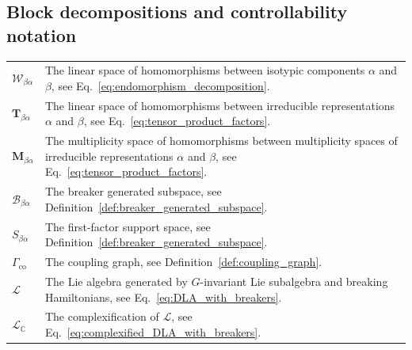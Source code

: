 \documentclass[10pt,twocolumn,superscriptaddress,aps,amsmath,amssymb,citeautoscript,floatfix,prx]{revtex4-2}
\newcounter{alg}
\theoremstyle{plain}
\theoremstyle{plain}
\theoremstyle{plain}
\theoremstyle{plain}
\theoremstyle{plain}
\theoremstyle{plain}
\newcommand{\C}{\mathbb{C}}
\theoremstyle{plain}
\theoremstyle{definition}
\theoremstyle{plain}
\begin{document}
\begin{appendix}
\begin{tabular}{@{}ll@{}}
\end{tabular}


\subsection*{Block decompositions and controllability notation}

\begin{tabular}{@{}ll@{}}

\parbox[t]{0.22\textwidth}{$\mathcal{W}_{\beta \alpha}$} & \parbox[t]{0.72\textwidth}{The linear space of homomorphisms between isotypic components $\alpha$ and $\beta$, see Eq.~\eqref{eq:endomorphism_decomposition}.} \\[0.6em]

\parbox[t]{0.22\textwidth}{$\mathbf{T}_{\beta \alpha}$} & \parbox[t]{0.72\textwidth}{The linear space of homomorphisms between irreducible representations $\alpha$ and $\beta$, see Eq.~\eqref{eq:tensor_product_factors}.} \\[0.6em]

\parbox[t]{0.22\textwidth}{$\mathbf{M}_{\beta \alpha}$} & \parbox[t]{0.72\textwidth}{The multiplicity space of homomorphisms between multiplicity spaces of irreducible representations $\alpha$ and $\beta$, see Eq.~\eqref{eq:tensor_product_factors}.} \\[0.6em]

\parbox[t]{0.22\textwidth}{$\mathcal{B}_{\beta \alpha}$} & \parbox[t]{0.72\textwidth}{The breaker generated subspace, see Definition~\ref{def:breaker_generated_subspace}.} \\[0.6em]

\parbox[t]{0.22\textwidth}{$S_{\beta \alpha}$} & \parbox[t]{0.72\textwidth}{The first-factor support space, see Definition~\ref{def:breaker_generated_subspace}.} \\[0.6em]

\parbox[t]{0.22\textwidth}{$\Gamma_{\mathrm{co}}$} & \parbox[t]{0.72\textwidth}{The coupling graph, see Definition~\ref{def:coupling_graph}.} \\[0.6em]

\parbox[t]{0.22\textwidth}{$\mathcal{L}$} & \parbox[t]{0.72\textwidth}{The Lie algebra generated by $G$-invariant Lie subalgebra and breaking Hamiltonians, see Eq.~\eqref{eq:DLA_with_breakers}.} \\[0.6em]

\parbox[t]{0.22\textwidth}{$\mathcal{L}_{\C}$} & \parbox[t]{0.72\textwidth}{The complexification of $\mathcal{L}$, see Eq.~\eqref{eq:complexified_DLA_with_breakers}.} \\[0.6em]


\end{tabular}
\end{appendix}
\end{document}
